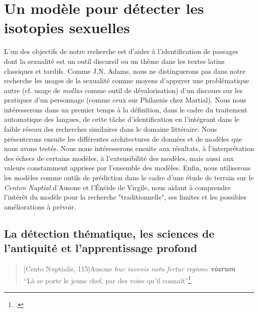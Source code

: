 \chapter{Un modèle pour détecter les isotopies sexuelles}

L'un des objectifs de notre recherche est d'aider à l'identification de passages dont la sexualité est un outil discursif ou un thème dans les textes latins classiques et tardifs. Comme J.N. Adams, nous ne distinguerons pas dans notre recherche les usages de la sexualité comme moyens d'appuyer une problématique autre (cf. usage de \textit{mollus} comme outil de dévalorisation) d'un discours sur les pratiques d'un personnage (comme ceux sur Philaenis chez Martial). Nous nous intéresserons dans un premier temps à la définition, dans le cadre du traitement automatique des langues, de cette tâche d'identification en l'intégrant dans le faible réseau des recherches similaires dans le domaine littéraire. Nous présenterons ensuite les différentes architectures de données et de modèles que nous avons testés. Nous nous intéresserons ensuite aux résultats, à ĺ'interprétation des échecs de certains modèles, à l'extensibilité des modèles, mais aussi aux valeurs constamment apprises par l'ensemble des modèles. Enfin, nous utiliserons les modèles comme outils de prédiction dans le cadre d'une étude de terrain sur le \textit{Centon Nuptial} d'Ausone et l'Énéide de Virgile, nous aidant à comprendre l'intérêt du modèle pour la recherche "traditionnelle", ses limites et les possibles améliorations à prévoir.

\section{La détection thématique, les sciences de l'antiquité et l'apprentissage profond}


\begin{quote}[Cento Nuptialis, 115]{Ausone}
    \textit{huc iuvenis nota fertur regione \textbf{viarum}} \\
    \enquote{Là se porte le jeune chef, par des voies qu'il connaît}\footcite{ausone_d_2010}
\end{quote}

